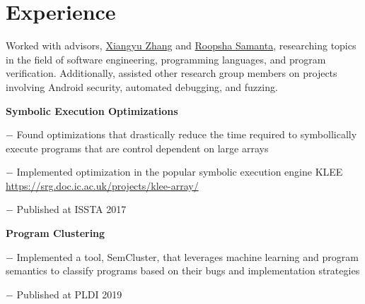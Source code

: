 \documentclass[]{deedy-resume-openfont}
\begin{document}
\hfill
\begin{minipage}[t]{0.66\textwidth} 


\section{Experience}

\vspace{.05in} %
Worked with advisors, \href{https://www.cs.purdue.edu/homes/xyzhang/}{Xiangyu Zhang} and 
\href{https://www.cs.purdue.edu/homes/roopsha/}{Roopsha Samanta}, researching topics in
the field of software engineering, programming languages, and program verification. 
Additionally, assisted other research group members on projects involving Android 
security, automated debugging, and fuzzing.
\vspace{.15in} %
\begin{tightemize}
\item {\selectfont\bfseries Symbolic Execution Optimizations}
	\vspace{.05in} %
	\begin{tightemize}
		\item[$-$] Found optimizations that drastically reduce the time required to symbollically execute
		   programs that are control dependent on large arrays
	   	\item[$-$]Implemented optimization in the popular symbolic execution engine KLEE 
			\url{https://srg.doc.ic.ac.uk/projects/klee-array/}
		\item[$-$] Published at ISSTA 2017
	\end{tightemize}
	\vspace{.05in} %
\item {\selectfont\bfseries Program Clustering}
	\begin{tightemize}
		\vspace{.05in} %
		\item[$-$] Implemented a tool, SemCluster, that leverages machine learning and
			   program semantics to classify programs based on their bugs and
			   implementation strategies
		\item[$-$] Published at PLDI 2019
	\end{tightemize}
\end{tightemize}
\sectionsep


\end{minipage}
\end{document}
